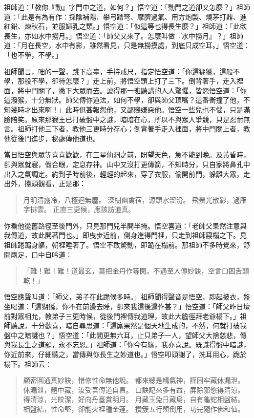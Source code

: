 祖師道：「教你『動』字門中之道，如何？」悟空道：「動門之道卻又怎麼？」祖師道：「此是有為有作：採陰補陽、攀弓踏弩、摩臍過氣、用方炮製、燒茅打鼎、進紅鉛、煉秋石，並服婦乳之類。」悟空道：「似這等也得長生麼？」祖師道：「此欲長生，亦如水中撈月。」悟空道：「師父又來了。怎麼叫做『水中撈月』？」祖師道：「月在長空，水中有影，雖然看見，只是無撈摸處，到底只成空耳。」悟空道：「也不學，不學。」

祖師聞言，咄的一聲，跳下高臺，手持戒尺，指定悟空道：「你這猢猻，這般不學，那般不學，卻待怎麼？」走上前，將悟空頭上打了三下。倒背著手，走入裡面，將中門關了，撇下大眾而去。諕得那一班聽講的人人驚懼，皆怨悟空道：「你這潑猴，十分無狀。師父傳你道法，如何不學，卻與師父頂嘴？這番衝撞了他，不知幾時才出來啊！」此時俱甚報怨他，又鄙賤嫌惡他。悟空一些兒也不惱，只是滿臉陪笑。原來那猴王已打破盤中之謎，暗暗在心，所以不與眾人爭競，只是忍耐無言。祖師打他三下者，教他三更時分存心；倒背著手走入裡面，將中門關上者，教他從後門進步，秘處傳他道也。

當日悟空與眾等喜喜歡歡，在三星仙洞之前，盼望天色，急不能到晚。及黃昏時，卻與眾就寢，假合眼，定息存神。山中又沒打更傳箭，不知時分，只自家將鼻孔中出入之氣調定。約到子時前後，輕輕的起來，穿了衣服，偷開前門，躲離大眾，走出外，擡頭觀看，正是那：
\begin{quote}
月明清露冷，八極迥無塵。
深樹幽禽宿，源頭水溜汾。
飛螢光散影，過雁字排雲。
正直三更候，應該訪道真。
\end{quote}

你看他從舊路徑至後門外，只見那門兒半開半掩。悟空喜道：「老師父果然注意與我傳道，故此開著門也。」即曳步近前，側身進得門裡，只走到祖師寢榻之下。見祖師踡跼身軀，朝裡睡著了。悟空不敢驚動，即跪在榻前。那祖師不多時覺來，舒開兩足，口中自吟道：
\begin{quote}
「難！難！難！道最玄，莫把金丹作等閑。不遇至人傳妙訣，空言口困舌頭乾！」
\end{quote}

悟空應聲叫道：「師父，弟子在此跪候多時。」祖師聞得聲音是悟空，即起披衣，盤坐喝道：「這猢猻，你不在前邊去睡，卻來我這後邊作甚？」悟空道：「師父昨日壇前對眾相允，教弟子三更時候，從後門裡傳我道理，故此大膽徑拜老爺榻下。」祖師聽說，十分歡喜，暗自尋思道：「這廝果然是個天地生成的，不然，何就打破我盤中之暗謎也？」悟空道：「此間更無六耳，止只弟子一人，望師父大捨慈悲，傳與我長生之道罷，永不忘恩。」祖師道：「你今有緣，我亦喜說。既識得盤中暗謎，你近前來，仔細聽之，當傳與你長生之妙道也。」悟空叩頭謝了，洗耳用心，跪於榻下。祖師云：
\begin{quote}
顯密圓通真妙訣，惜修性命無他說。
都來總是精氣神，謹固牢藏休漏泄。
休漏泄，體中藏，汝受吾傳道自昌。
口訣記來多有益，屏除邪慾得清涼。
得清涼，光皎潔，好向丹臺賞明月。
月藏玉兔日藏烏，自有龜蛇相盤結。
相盤結，性命堅，卻能火裡種金蓮。
攢簇五行顛倒用，功完隨作佛和仙。
\end{quote}

